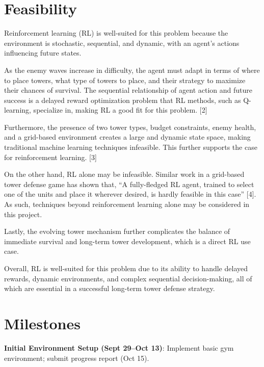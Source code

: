 \documentclass[12pt]{article}
\newcounter{ques}
\begin{document}
\section*{Feasibility}

Reinforcement learning (RL) is well-suited for this problem because the environment is stochastic, sequential, and dynamic, with an agent's actions influencing future states. \par 

As the enemy waves increase in difficulty, the agent must adapt in terms of where to place towers, what type of towers to place, and their strategy to maximize their chances of survival. The sequential relationship of agent action and future success is a delayed reward optimization problem that RL methods, such as Q-learning, specialize in, making RL a good fit for this problem. [2] \par

Furthermore, the presence of two tower types, budget constraints, enemy health, and a grid-based environment creates a large and dynamic state space, making traditional machine learning techniques infeasible. This further supports the case for reinforcement learning. [3] \par

On the other hand, RL alone may be infeasible. Similar work in a grid-based tower defense game has shown that, ``A fully-fledged RL agent, trained to select one of the units and place it wherever desired, is hardly feasible in this case'' [4]. As such, techniques beyond reinforcement learning alone may be considered in this project. \par

Lastly, the evolving tower mechanism further complicates the balance of immediate survival and long-term tower development, which is a direct RL use case. \par

Overall, RL is well-suited for this problem due to its ability to handle delayed rewards, dynamic environments, and complex sequential decision-making, all of which are essential in a successful long-term tower defense strategy.


\section*{Milestones}

\textbf{Initial Environment Setup (Sept 29--Oct 13)}: Implement basic gym environment; submit progress report (Oct 15). 
\end{document}
